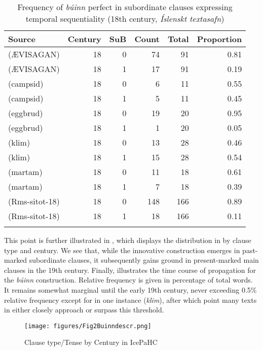 \documentclass[output=paper,colorlinks,citecolor=brown]{langscibook}
\begin{document}
\begin{table}
\small
\begin{tabularx}{.8\textwidth}{Xrrrrr}
\lsptoprule
Source & Century & SuB & Count & Total & Proportion \\ 
\midrule
(ÆVISAGAN) & 18 & 0 & 74 & 91 & 0.81 \\ 
(ÆVISAGAN) & 18 & 1 & 17 & 91 & 0.19 \\ 
(campsid) & 18 & 0 & 6 & 11 & 0.55 \\ 
(campsid) & 18 & 1 & 5 & 11 & 0.45 \\ 
(eggbrud) & 18 & 0 & 19 & 20 & 0.95 \\ 
(eggbrud) & 18 & 1 & 1 & 20 & 0.05 \\ 
(klim) & 18 & 0 & 13 & 28 & 0.46 \\ 
(klim) & 18 & 1 & 15 & 28 & 0.54 \\ 
(martam) & 18 & 0 & 11 & 18 & 0.61 \\ 
(martam) & 18 & 1 & 7 & 18 & 0.39 \\ 
(Rms-sitot-18) & 18 & 0 & 148 & 166 & 0.89 \\ 
(Rms-sitot-18) & 18 & 1 & 18 & 166 & 0.11 \\ 
\lspbottomrule
\end{tabularx}
\caption{Frequency of \textit{búinn} perfect in subordinate clauses expressing temporal sequentiality (18th century, \textit{Íslenskt textasafn})}
\label{tab:subafter1}
\end{table}

This point is further illustrated in , which displays the distribution in  by clause type and century. We see that, while the innovative construction emerges in past-marked subordinate clauses, it subsequently gains ground in present-marked main clauses in the 19th century. Finally,  illustrates the time course of propagation for the \textit{búinn} construction. Relative frequency is given in percentage of total words. It remains somewhat marginal until the early 19th century, never exceeding 0.5\% relative frequency except for in one instance (\textit{klim}), after which point many texts in  either closely approach or surpass this threshold.

\begin{figure}
        \texttt{[image: figures/Fig2Buinndescr.png]}
        \caption{Clause type/Tense by Century in IcePaHC}
        \label{fig:image1}
\end{figure}
\end{document}
